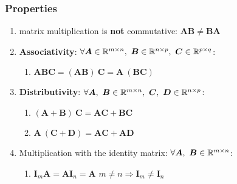 \subsubsection{Properties}

\begin{enumerate}
    \item matrix multiplication is \textbf{not} commutative: $\bm{AB} \neq \bm{BA}$
    \hfill \cite{mfml/book/mml/Deisenroth-Faisal-Ong}

    \item \textbf{Associativity}: 
    $
        \forall 
        \bm{A} \in \mbbR^{m\times n},\ 
        \bm{B} \in \mbbR^{n\times p},\ 
        \bm{C} \in \mbbR^{p\times q}
    $:
    
        \begin{enumerate}
            \item $\bm{ABC} = (\bm{AB})\ \bm{C} = \bm{A}\ (\bm{BC})$
            \hfill \cite{mfml/book/mml/Deisenroth-Faisal-Ong}
        \end{enumerate}

    \item \textbf{Distributivity}: 
    $
        \forall 
        \bm{A},\ \bm{B}\in \mbbR^{m\times n},\ 
        \bm{C},\ \bm{D}\in \mbbR^{n\times p}
    $:

        \begin{enumerate}
            \item $(\bm{A} + \bm{B})\ \bm{C} = \bm{AC} + \bm{BC}$
            \hfill \cite{mfml/book/mml/Deisenroth-Faisal-Ong}
            
            \item $\bm{A}\ (\bm{C} + \bm{D}) = \bm{AC} + \bm{AD}$
            \hfill \cite{mfml/book/mml/Deisenroth-Faisal-Ong}
        \end{enumerate}

    \item Multiplication with the identity matrix: 
    $
        \forall 
        \bm{A},\ \bm{B}\in \mathbb{R}^{m\times n}
    $:
        \begin{enumerate}
            \item $\bm{I}_m\bm{A} = \bm{AI}_n = \bm{A}$
            \hfill $m\neq n \Rightarrow \bm{I}_m \neq \bm{I}_n$
            \hfill \cite{mfml/book/mml/Deisenroth-Faisal-Ong}
        \end{enumerate}
\end{enumerate}















